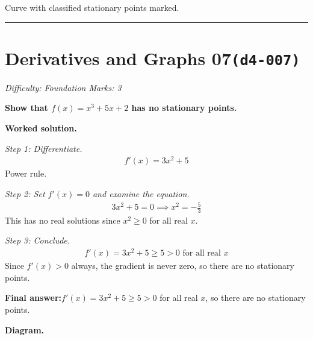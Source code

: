 \documentclass[11pt]{article}
\newcommand{\question}[1]{\par\medskip\noindent\textbf{#1}\par}
\begin{document}
\begin{center}
{
}
\end{center}
\small Curve with classified stationary points marked.\normalsize

\medskip\hrule

\section*{Derivatives and Graphs 07\quad\small\texttt{(d4-007)}}
\textit{Difficulty: Foundation \quad\textbar\quad Marks: 3}

\question{Show that \( f(x) = x^3 + 5x + 2 \) has no stationary points.}

\textbf{Worked solution.}

\textit{Step 1: Differentiate.}
\[\begin{gathered}
f'(x) = 3x^2 + 5
\end{gathered}\]
Power rule.

\textit{Step 2: Set \( f'(x) = 0 \) and examine the equation.}
\[\begin{gathered}
3x^2 + 5 = 0 \implies x^2 = -\tfrac{5}{3}
\end{gathered}\]
This has no real solutions since \( x^2 \geq 0 \) for all real \( x \).

\textit{Step 3: Conclude.}
\[\begin{gathered}
f'(x) = 3x^2 + 5 \geq 5 > 0 \text{ for all real } x
\end{gathered}\]
Since \( f'(x) > 0 \) always, the gradient is never zero, so there are no stationary points.

\begin{answerbox}
\textbf{Final answer:}\quad \(\displaystyle  f'(x) = 3x^2 + 5 \geq 5 > 0 \) for all real \(\displaystyle  x \), so there are no stationary points.
\end{answerbox}
\textbf{Diagram.}
\end{document}
